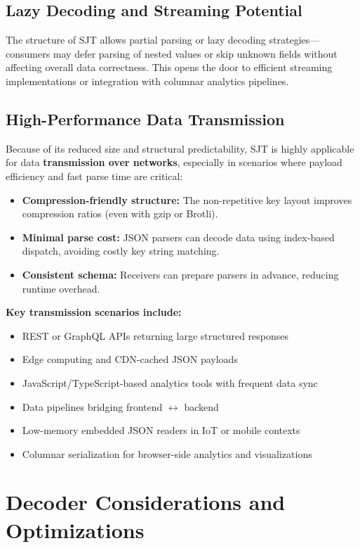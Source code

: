 \documentclass[12pt]{article}
\begin{document}
\subsection{Lazy Decoding and Streaming Potential}
The structure of SJT allows partial parsing or lazy decoding strategies---consumers may defer parsing of nested values or skip unknown fields without affecting overall data correctness. This opens the door to efficient streaming implementations or integration with columnar analytics pipelines.

\subsection{High-Performance Data Transmission}
Because of its reduced size and structural predictability, SJT is highly applicable for data \textbf{transmission over networks}, especially in scenarios where payload efficiency and fast parse time are critical:

\begin{itemize}
  \item \textbf{Compression-friendly structure:} The non-repetitive key layout improves compression ratios (even with gzip or Brotli).
  \item \textbf{Minimal parse cost:} JSON parsers can decode data using index-based dispatch, avoiding costly key string matching.
  \item \textbf{Consistent schema:} Receivers can prepare parsers in advance, reducing runtime overhead.
\end{itemize}

\textbf{Key transmission scenarios include:}
\begin{itemize}
  \item REST or GraphQL APIs returning large structured responses
  \item Edge computing and CDN-cached JSON payloads
  \item JavaScript/TypeScript-based analytics tools with frequent data sync
  \item Data pipelines bridging frontend $\leftrightarrow$ backend
  \item Low-memory embedded JSON readers in IoT or mobile contexts
  \item Columnar serialization for browser-side analytics and visualizations
\end{itemize}
\section{Decoder Considerations and Optimizations}
\end{document}

